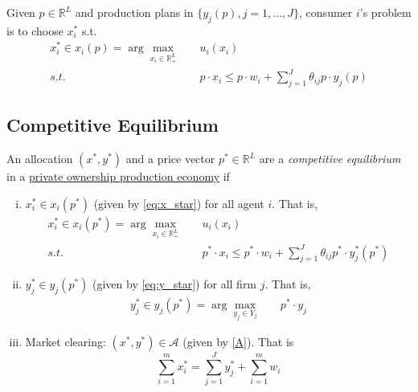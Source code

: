 \documentclass[11pt]{elegantbook}
\begin{document}
Given $p\in \mathbb{R}^L$ and production plans in $\{y_j(p),j=1,...,J\}$, consumer $i$'s problem is to choose $x_i^*$ s.t.
\begin{equation}
    \begin{aligned}
        x_i^*\in x_i(p)=\arg\max_{x_i\in \mathbb{R}^L_+}\quad& u_i(x_i)\\
        s.t.\quad& p\cdot x_i\leq p\cdot w_i+\sum_{j=1}^J\theta_{ij}p\cdot y_j(p)
    \end{aligned}
    \tag{xstar}
    \label{eq:x_star}
\end{equation}

\subsection{Competitive Equilibrium}
\begin{definition}
    \normalfont
    An allocation $(x^*,y^*)$ and a price vector $p^*\in \mathbb{R}^L$ are a \textit{competitive equilibrium} in a \underline{private ownership production economy} if
    \begin{enumerate}[(i).]
        \item $x_i^*\in x_i(p^*)$ (given by \eqref{eq:x_star}) for all agent $i$. That is,
        \begin{equation}
            \begin{aligned}
                x_i^*\in x_i(p^*)=\arg\max_{x_i\in \mathbb{R}^L_+}\quad& u_i(x_i)\\
        s.t.\quad& p^*\cdot x_i\leq p^*\cdot w_i+\sum_{j=1}^J\theta_{ij}p^*\cdot y^*_j(p^*)
            \end{aligned}
            \nonumber
        \end{equation}
        \item $y_j^*\in y_j(p^*)$ (given by \eqref{eq:y_star}) for all firm $j$. That is,
        \begin{equation}
            \begin{aligned}
                y_j^*\in y_j(p^*)=\arg\max_{y_j\in Y_j}\quad &p^*\cdot y_j
            \end{aligned}
            \nonumber
        \end{equation}
        \item Market clearing: $(x^*,y^*)\in \mathcal{A}$ (given by \eqref{A}). That is $$\sum_{i=1}^m x_i^*=\sum_{j=1}^J y_j^*+\sum_{i=1}^m w_i$$
    \end{enumerate}
\end{definition}
\end{document}
